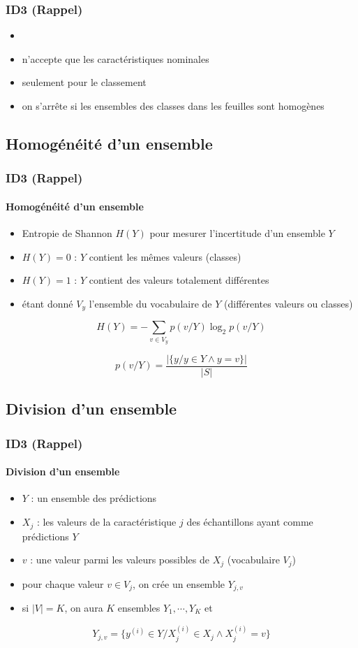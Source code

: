 \documentclass[xcolor=table]{beamer}
\begin{document}
\begin{frame}
	\frametitle{ID3 (Rappel)}
	
	\begin{itemize}
		\item {}
		\item n'accepte que les caractéristiques nominales
		\item seulement pour le classement
		\item on s'arrête si les ensembles des classes dans les feuilles sont homogènes
	\end{itemize}
	
\end{frame}

\subsection{Homogénéité d'un ensemble}

\begin{frame}
	\frametitle{ID3 (Rappel)}
	\framesubtitle{Homogénéité d'un ensemble}
	
	\begin{itemize}
		\item Entropie de Shannon $H(Y)$ pour mesurer l'incertitude d'un ensemble $Y$
		\item $H(Y)=0$ : $Y$ contient les mêmes valeurs (classes)
		\item $H(Y)=1$ : $Y$ contient des valeurs totalement différentes
		\item étant donné $V_y$ l'ensemble du vocabulaire de $Y$ (différentes valeurs ou classes)
	\end{itemize}

	\[H(Y) = - \sum\limits_{v \in V_y} p(v/Y) \log_2 p(v/Y)\]
	
	\[p(v/Y) = \frac{|\{y / y \in Y \wedge y = v\}|}{|S|}\]
	
\end{frame}

\subsection{Division d'un ensemble}

\begin{frame}
	\frametitle{ID3 (Rappel)}
	\framesubtitle{Division d'un ensemble}
	
	\begin{itemize}
		\item $Y$ : un ensemble des prédictions 
		\item $X_j$ : les valeurs de la caractéristique $j$ des échantillons ayant comme prédictions $Y$
		\item $v$ : une valeur parmi les valeurs possibles de $X_j$ (vocabulaire $V_j$)
		\item pour chaque valeur $v \in V_j$, on crée un ensemble $Y_{j, v}$
		\item si $|V| = K$, on aura $K$ ensembles $Y_1, \cdots, Y_K$ et 
	\end{itemize}
	
	\[Y_{j,v} = \{y^{(i)} \in Y / X_j^{(i)} \in X_j \wedge X_j^{(i)} = v\}\]

	
\end{frame}
\end{document}
